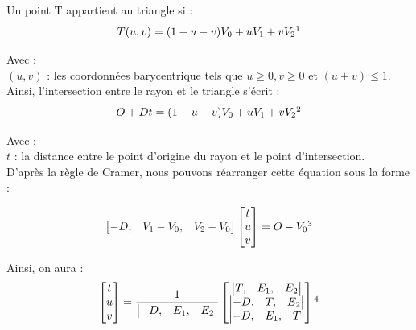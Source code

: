 Un point T appartient au triangle si : 
\begin{equation} \label{eq_2moller}
T(u,v) = (1-u-v)V_0 + uV_1 + vV_2 \footnotemark
\end{equation}

Avec :  \\
$(u,v)$ : les coordonnées barycentrique tels que $u\geqslant0, v\geqslant0$ et $(u+v)\leqslant1$. \\

Ainsi, l'intersection entre le rayon et le triangle s'écrit :
\begin{equation}
O + Dt = (1-u-v)V_0 + uV_1 + vV_2 \footnotemark
\end{equation}

Avec : \\
$t$ : la distance entre le point d'origine du rayon et le point d'intersection. \\

D'après la règle de Cramer, nous pouvons réarranger cette équation sous la forme :


\begin{equation}
	\begin{bmatrix}
 	  -D, & V_1-V_0, & V_2-V_0
	\end{bmatrix}
	\begin{bmatrix}
 	 t \\
	 u \\
	 v
	\end{bmatrix}
	= O-V_0
	\footnotemark
\end{equation}

Ainsi, on aura :
\begin{equation}
	\begin{bmatrix}
 	 t \\
	 u \\
	 v
	\end{bmatrix}
	=
	\frac{1}{
	\begin{vmatrix}
 	  -D, & E_1, & E_2
	\end{vmatrix}
	}
	\begin{bmatrix}
 	 	\begin{vmatrix}
 		  T, & E_1, & E_2
		\end{vmatrix} \\
 	 	\begin{vmatrix}
 		  -D, & T, & E_2
		\end{vmatrix} \\
 	 	\begin{vmatrix}
 		  -D, & E_1, & T
		\end{vmatrix}
	\end{bmatrix}	
	\footnotemark
\end{equation}

